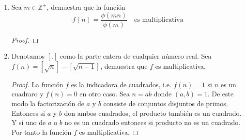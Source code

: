\documentclass[letterpaper]{article}
\newcommand{\Z}{\mathbb{Z}}
\DeclareMathOperator{\lcm}{lcm}
\begin{document}
\begin{enumerate}
\begin{proof}
Sea $n=ab$ con $a, b \in \Z$ tal que $\gcd(a,b) = 1$ entonces,

\begin{align*}
    \gcd(m, ab)
        &= \gcd(m, \lcm(a, b))
            && \text{Como $\gcd(a,b) = 1$, entonces $\lcm(a,b) = ab$}\\
        &= \lcm(\gcd(m,a), \gcd(m,b))
            && \text{El $\gcd$ y $\lcm$ se distribuyen sobre cada uno}\\
        &= \frac{\gcd(m,a) \gcd(m,b)} {\gcd(\gcd(m,a) \gcd(m,b))}
            && \text{Producto del gcd con el lcm}\\
        &= \frac{\gcd(m,a) \gcd(m,b)} {\gcd(m,\gcd(a, \gcd(m,b)))}
            && \text{Máximo común divisor es asociativo}\\
            &= \frac{\gcd(m,a) \gcd(m,b)} {\gcd(m ,\gcd(\gcd(a,b),m))}
            && \text{Máximo común divisor es asociativo}\\
        &= \frac{\gcd(m,a) \gcd(m,b)} {\gcd(n, \gcd(1,n))}
            && \text{Por ser primos relativos}\\
        &= \frac{\gcd (m,a)(m,b)} {\gcd(m,1)}\\
        &= \frac{\gcd(m,a) \gcd(m,b)} {1}\\
        &= \gcd(m,a) \gcd(m,b)
\end{align*}
Ergo, el máximo común divisor con un argumento fijo es una función multiplicativa, i.e.

$$ f(ab) = \gcd(ab, m) = \gcd(a,m) \cdot \gcd(b,m) = f(a) \cdot f(b). $$
\end{proof}

\item Sea $m \in \Z^+$, demuestra que la función
\[ f(n) = \frac{\phi(mn)}{\phi(m)} \quad \text{es multiplicativa}\]
\begin{proof}
    
\end{proof}

\item Denotamos $\left[.\right]$ como la parte entera de cualquier número real. Sea
$f(n)= \left[{\sqrt{n}}\right] - \left[{\sqrt{n-1}}\right]$, demuestra que $f$ es multiplicativa.
\begin{proof}
La función $f$ es la indicadora de cuadrados, i.e. $f(n) = 1$ si $n$ es un cuadraro y $f(n) = 0$ en otro caso.
Sea $n = ab$ donde $(a,b) = 1$. De este modo la factorización de $a$ y $b$ consiste de conjuntos disjuntos
de primos. Entonces si $a$ y $b$ don ambos cuadrados, el producto también es un cuadrado. Y si uno de
$a$ o $b$ no es un cuadrado entonces si producto no es un cuadrado. Por tanto la función $f$ es multiplicativa.
\end{proof}


\end{enumerate}
\end{document}
